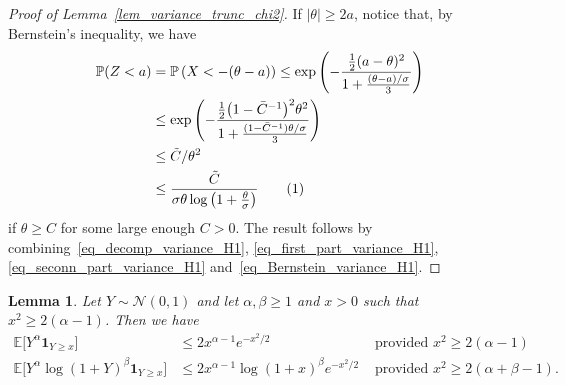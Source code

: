 \documentclass{article}
\newcommand{\one}{\mathbf{1}}
\newcommand\numberthis{\addtocounter{equation}{1}\tag{\theequation}}
\newtheorem{lemma}{Lemma}
\begin{document}
\begin{proof}[Proof of Lemma~\ref{lem_variance_trunc_chi2}]
If $|\theta| \geq 2 a$, notice that, by Bernstein's inequality, we have
\begin{align*}
    \mathbb{P}(Z<a) &= \mathbb P \left(X < -(\theta-a)\right)\leq \exp\left(-\frac{\frac{1}{2} (a-\theta)^2}{1 + \frac{(\theta - a)/\sigma}{3}}\right)\\
    & \leq \exp\left(-\frac{\frac{1}{2} \big(1-{\bar C}^{-1}\big)^2\theta^2}{1 + \frac{(1-{\bar C}^{-1})\theta/\sigma}{3}}\right)\\
    &\leq \tilde C / \theta^{2}\\
    & \leq \frac{\tilde C}{\sigma \theta \log\left(1+\frac{\theta}{\sigma}\right)}\numberthis\label{eq_Bernstein_variance_H1}
\end{align*}
if $\theta \geq C$ for some large enough $C>0$. 
The result follows by combining~\eqref{eq_decomp_variance_H1}, \eqref{eq_first_part_variance_H1}, \eqref{eq_seconn_part_variance_H1} and~\eqref{eq_Bernstein_variance_H1}.

\end{proof}

\begin{lemma}\label{lem:gaussian_tail_momentk_ellt}
Let $Y \sim \mathcal{N}(0,1)$ and let $ \alpha, \beta \geq 1 $ and $x>0$ such that $x^2 \geq 2(\alpha-1) $. Then we have 
\begin{align*}
    \mathbb E \big[ Y^\alpha \one_{Y\geq x}\big] &\leq 2 x^{\alpha -1} e^{-x^2/2} & \text{ provided $x^2 \geq 2(\alpha-1) $}\\
    \mathbb E \big[ Y^\alpha \log(1+Y)^\beta\one_{Y\geq x}\big] &\leq 2 x^{\alpha -1} \log(1+x)^\beta e^{-x^2/2}& \text{ provided $x^2 \geq 2(\alpha+\beta-1) $.}
\end{align*}

\end{lemma}
\end{document}
